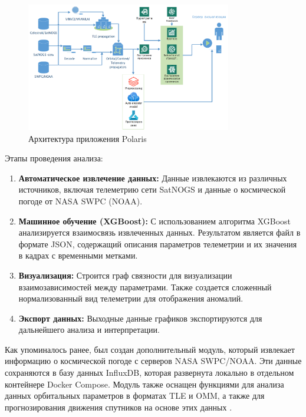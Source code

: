 \documentclass[12pt, a4paper]{extreport}
\begin{document}
\begin{figure}[htbp]
    \centering
    \includegraphics[width=0.8\textwidth]{polaris_architecture.png}
    \caption{Архитектура приложения Polaris}
    \label{fig:polaris_architecture}
\end{figure}

Этапы проведения анализа:

\begin{enumerate}[label=\arabic*.]
    \item \textbf{Автоматическое извлечение данных:}
          Данные извлекаются из различных источников, включая телеметрию сети SatNOGS и данные о космической погоде от NASA SWPC (NOAA).

    \item \textbf{Машинное обучение (XGBoost):}
          С использованием алгоритма XGBoost \cite{xgboost}\cite{boumghar2018enhanced} анализируется взаимосвязь извлеченных данных. Результатом является файл в формате JSON, содержащий описания параметров телеметрии и их значения в кадрах с временными метками.

    \item \textbf{Визуализация:}
          Строится граф связности для визуализации взаимозависимостей между параметрами. Также создается сложенный нормализованный вид телеметрии для отображения аномалий.

    \item \textbf{Экспорт данных:}
          Выходные данные графиков экспортируются для дальнейшего анализа и интерпретации.
\end{enumerate}

Как упоминалось ранее, был создан дополнительный модуль, который извлекает информацию о космической погоде с серверов NASA SWPC/NOAA. Эти данные сохраняются в базу данных InfluxDB, которая развернута локально в отдельном контейнере Docker Compose. Модуль также оснащен функциями для анализа данных орбитальных параметров в форматах TLE и OMM, а также для прогнозирования движения спутников на основе этих данных \cite{bottou1991stochastic}\cite{killick2012optimal}.
\end{document}
